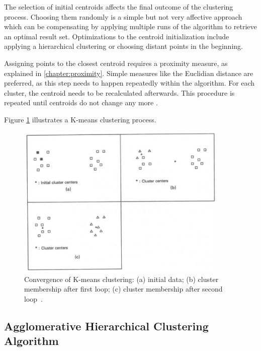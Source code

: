 The selection of initial centroids affects the final outcome of the clustering process. Choosing them randomly is a simple but not very affective approach which can be compensating by applying multiple runs of the algorithm to retrieve an optimal result set. Optimizations to the centroid initialization include applying a hierarchical clustering or choosing distant points in the beginning.

Assigning points to the closest centroid requires a proximity measure, as explained in \ref{chapter:proximity}. Simple measures like the Euclidian distance are preferred, as this step needs to happen repeatedly within the algorithm. For each cluster, the centroid needs to be recalculated afterwards. This procedure is repeated until centroids do not change any more \cite{Jain99clusterreview, Meert06clustermaps}.

Figure \ref{fig:clustering_k-means} illustrates a K-means clustering process.

\begin{figure}[h]
  \begin{center}
    \includegraphics[width=0.9\textwidth]{figures/clustering_k-means.png}
    \caption{Convergence of K-means clustering: (a) initial data; (b) cluster membership after first loop; (c) cluster membership after second loop~\cite[p 99]{Jain88clustering}.}
    \label{fig:clustering_k-means}
  \end{center}
\end{figure}


\subsection{Agglomerative Hierarchical Clustering Algorithm}

